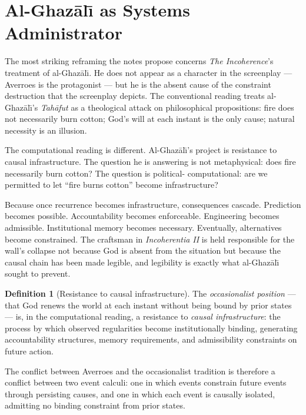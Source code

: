 \documentclass[11pt, a4paper]{article}
\theoremstyle{definition}
\newtheorem{definition}{Definition}
\theoremstyle{remark}
\begin{document}
\section{Al-Ghaz\={a}l{\=\i} as Systems Administrator}

The most striking reframing the notes propose concerns \textit{The Incoherence}'s
treatment of al-Ghaz\={a}l{\=\i}. He does not appear as a character in the
screenplay --- Averroes is the protagonist --- but he is the absent cause of
the constraint destruction that the screenplay depicts. The conventional reading
treats al-Ghaz\={a}l{\=\i}'s \textit{Tah\={a}fut} as a theological attack
on philosophical propositions: fire does not necessarily burn cotton; God's
will at each instant is the only cause; natural necessity is an illusion.

The computational reading is different. Al-Ghaz\={a}l{\=\i}'s project is
resistance to causal infrastructure. The question he is answering is not
metaphysical: does fire necessarily burn cotton? The question is political-
computational: are we permitted to let ``fire burns cotton'' become infrastructure?

Because once recurrence becomes infrastructure, consequences cascade. Prediction
becomes possible. Accountability becomes enforceable. Engineering becomes
admissible. Institutional memory becomes necessary. Eventually, alternatives
become constrained. The craftsman in \textit{Incoherentia II} is held
responsible for the wall's collapse not because God is absent from the situation
but because the causal chain has been made legible, and legibility is exactly
what al-Ghaz\={a}l{\=\i} sought to prevent.

\begin{definition}[Resistance to causal infrastructure]
The \textit{occasionalist position} --- that God renews the world at each
instant without being bound by prior states --- is, in the computational
reading, a resistance to \textit{causal infrastructure}: the process by which
observed regularities become institutionally binding, generating accountability
structures, memory requirements, and admissibility constraints on future action.

The conflict between Averroes and the occasionalist tradition is therefore a
conflict between two event calculi: one in which events constrain future events
through persisting causes, and one in which each event is causally isolated,
admitting no binding constraint from prior states.
\end{definition}
\end{document}
